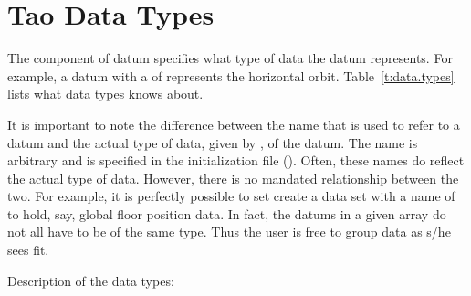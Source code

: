 \section{Tao Data Types}
\label{s:data.types}

The  component of datum specifies what type of data the
datum represents. For example, a datum with a  of
 represents the horizontal orbit. Table~\ref{t:data.types} lists
what data types \tao knows about.

It is important to note the difference between the  name
that is used to refer to a datum and the actual type of data, given by
, of the datum. The  name is arbitrary and is
specified in the \tao initialization file (). Often,
these names do reflect the actual type of data. However, there is no
mandated relationship between the two. For example, it is perfectly
possible to set create a data set with a  name of
 to hold, say, global floor position data. In fact, the
datums in a given  array do not all have to be of the same
type. Thus the user is free to group data as s/he sees fit.

Description of the data types:

